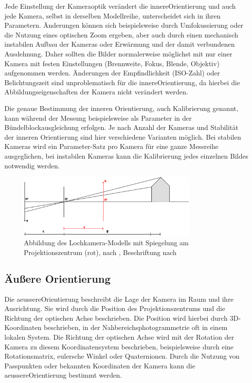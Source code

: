 \documentclass[./00PhotoBox.tex]{subfiles}
\begin{document}
Jede Einstellung der Kameraoptik verändert die \gls{innereOrientierung} und auch jede Kamera, selbst in derselben Modellreihe, unterscheidet sich in ihren Parametern. Änderungen können sich beispielsweise durch Umfokussierung oder die Nutzung eines optischen Zoom ergeben, aber auch durch einen mechanisch instabilen Aufbau der Kameras oder Erwärmung und der damit verbundenen Ausdehnung. Daher sollten die Bilder normalerweise möglichst mit nur einer Kamera mit festen Einstellungen (Brennweite, Fokus, Blende, Objektiv) aufgenommen werden. Änderungen der Empfindlichkeit (ISO-Zahl) oder Belichtungszeit sind unproblematisch für die \gls{innereOrientierung}, da hierbei die Abbildungseigenschaften der Kamera nicht verändert werden. \citep[S. 176]{luhmann}

Die genaue Bestimmung der inneren Orientierung, auch Kalibrierung genannt, kann wäh\-rend der Messung beispielsweise als Parameter in der Bündel\-block\-ausgleichung erfolgen. Je nach Anzahl der Kameras und Stabilität der inneren Orientierung sind hier verschiedene Varianten möglich. Bei stabilen Kameras wird ein Parameter-Satz pro Kamera für eine ganze Messreihe ausgeglichen, bei instabilen Kameras kann die Kalibrierung jedes einzelnen Bildes notwendig werden. \citep[S. 181f]{luhmann}

\begin{figure}
    \centering
    \includegraphics[width=0.8\textwidth]{./img/2_grundlagen/optischeAchse.pdf}
    \caption{Abbildung des Lochkamera-Modells mit Spiegelung am Projektionszentrum (rot), nach \citet[S. 154]{hartley}, Beschriftung nach \citet[S. 177]{luhmann}}
    \label{img:optische_achse}
\end{figure}


\subsection{Äußere Orientierung}
\label{s:aeussereorientierung}
Die \gls{aeussereOrientierung} beschreibt die Lage der Kamera im Raum und ihre Ausrichtung. Sie wird durch die Position des Projektionszentrums und die Richtung der optischen Achse beschrieben. Die Position wird hierbei durch 3D-Koordinaten beschrieben, in der Nahbereichsphotogrammetrie oft in einem lokalen System. Die Richtung der optischen Achse wird mit der Rotation der Kamera zu diesem Koordinatensystem beschrieben, beispielsweise durch eine Rotationsmatrix, eulersche Winkel oder Quaternionen. Durch die Nutzung von Passpunkten oder bekannten Koordinaten der Kamera kann die \gls{aeussereOrientierung} bestimmt werden. \citep[S. 273ff]{luhmann}
\end{document}
